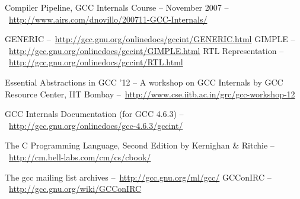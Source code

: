 \begin{thebibliography}{99}
Compiler Pipeline, GCC Internals Course -- November 2007 --\ \url{http://www.airs.com/dnovillo/200711-GCC-Internals/}

GENERIC --\ \url{http://gcc.gnu.org/onlinedocs/gccint/GENERIC.html}
GIMPLE --\ \url{http://gcc.gnu.org/onlinedocs/gccint/GIMPLE.html}
RTL Representation --\ \url{http://gcc.gnu.org/onlinedocs/gccint/RTL.html}

Essential Abstractions in GCC '12 -- A workshop on GCC Internals by GCC Resource Center, IIT Bombay --\ \url{http://www.cse.iitb.ac.in/grc/gcc-workshop-12}

GCC Internals Documentation (for GCC 4.6.3) --\ \url{http://gcc.gnu.org/onlinedocs/gcc-4.6.3/gccint/}

The C Programming Language, Second Edition by Kernighan \& Ritchie --\ \url{http://cm.bell-labs.com/cm/cs/cbook/}

The gcc mailing list archives --\ \url{http://gcc.gnu.org/ml/gcc/}
GCConIRC --\ \url{http://gcc.gnu.org/wiki/GCConIRC}

\end{thebibliography}
